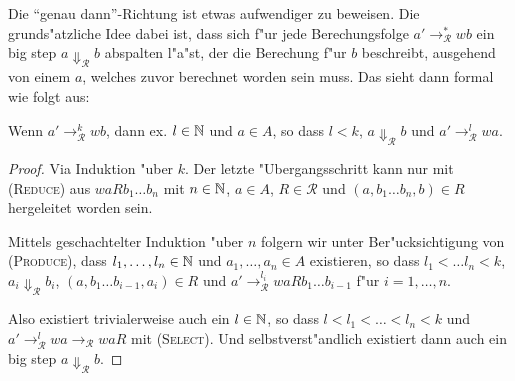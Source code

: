 \documentclass[12pt,a4paper,final]{article}
\begin{document}
Die ``genau dann''-Richtung ist etwas aufwendiger zu beweisen. Die grund\-s"atzliche Idee dabei
ist, dass sich f"ur jede Berechungsfolge \mbox{$a' \rightarrow_{\mathcal{R}}^* wb$} ein big step
\mbox{$a \Downarrow_{\mathcal{R}} b$} abspalten l"a"st, der die Berechung f"ur $b$ beschreibt, ausgehend
von einem $a$, welches zuvor berechnet worden sein muss. Das sieht dann formal wie folgt aus:
\begin{lemma}
  Wenn \mbox{$a' \rightarrow_{\mathcal{R}}^k wb$}, dann ex. \mbox{$l \in \mathbb N$} und \mbox{$a \in A$}, so dass
  \mbox{$l < k$}, \mbox{$a \Downarrow_{\mathcal{R}} b$} und \mbox{$a' \rightarrow_{\mathcal{R}}^l wa$}.
\end{lemma}

\begin{proof}
  Via Induktion "uber $k$.
  Der letzte "Ubergangsschritt kann nur mit \textsc{(Reduce)} aus \mbox{$waRb_1 \ldots b_n$}
  mit \mbox{$n \in \mathbb N$}, \mbox{$a \in A$}, \mbox{$R \in \mathcal{R}$} und \mbox{$(a,b_1 \ldots b_n,b) \in R$}
  hergeleitet worden sein.

  Mittels geschachtelter Induktion "uber $n$ folgern wir unter Ber"ucksichtigung von \textsc{(Produce)},
  dass \mbox{$l_1,\ldots,l_n \in \mathbb N$} und \mbox{$a_1,\ldots,a_n \in A$} existieren, so dass
  \mbox{$l_1 < \ldots l_n < k$}, \mbox{$a_i \Downarrow_{\mathcal{R}} b_i$}, \mbox{$(a,b_1 \ldots b_{i-1},a_i) \in R$}
  und \mbox{$a' \rightarrow_{\mathcal{R}}^{l_i} waRb_1 \ldots b_{i-1}$} f"ur \mbox{$i=1,\ldots,n$}.

  Also existiert trivialerweise auch ein \mbox{$l \in \mathbb N$}, so dass \mbox{$l < l_1 < \ldots < l_n < k$} und
  \mbox{$a' \rightarrow_{\mathcal{R}}^l wa \rightarrow_{\mathcal{R}} waR$} mit \textsc{(Select)}. Und selbstverst"andlich
  existiert dann auch ein big step $a \Downarrow_{\mathcal{R}} b$.
\end{proof}





\end{document}
